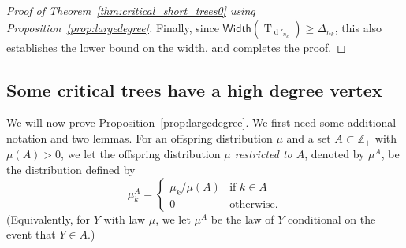 \documentclass[10pt]{amsart}
\theoremstyle{definition}\newtheorem{defi}[theo]{Definition}\newtheorem{rema}[theo]{Remark}\newtheorem{exam}[theo]{Example}\newtheorem{exem}[theo]{Example}\newtheorem{nota}[theo]{Notation}
\newcommand{\Z}{\mathbb{Z}}
\newcommand{\Width}{\mathsf{Width}}
\DeclareMathOperator{\rtree}{T}
\DeclareMathOperator{\dseq}{d}
\begin{document}
\begin{proof}[Proof of Theorem~\ref{thm:critical_short_trees0} {using Proposition~\ref{prop:largedegree}}]
Finally, since $\Width(\rtree_{\dseq'_{n_k}}) \ge \Delta_{n_k}$, this also establishes the lower bound on the width, and completes the proof.
\end{proof}

\subsection{{Some critical trees have a high degree vertex}}

We will now prove Proposition~\ref{prop:largedegree}. We first need some additional notation and two lemmas. For an offspring distribution $\mu$ and a set $A\subset \Z_+$ with $\mu(A)>0$, we let the offspring distribution \emph{$\mu$ restricted to $A$}, denoted by $\mu^A$, be the distribution defined by
\[
\mu^A _{k}=
\begin{cases}\mu_k/\mu(A)&\text{if }k\in A \\ 0&
\text{otherwise.}
\end{cases}
\]
(Equivalently, for $Y$ with law $\mu$, we let $\mu^A$ be the law of $Y$ conditional on the event that $Y\in A$.)
\end{document}
